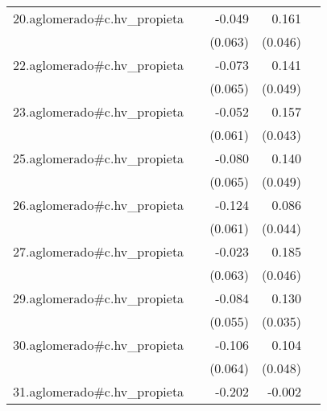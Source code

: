 {\begin{longtable}{l*{4}{D{.}{.}{-1}}}
\addlinespace
20.aglomerado#c.hv\_propieta&                     &      -0.049         &       0.161\sym{***}&                     \\
            &                     &     (0.063)         &     (0.046)         &                     \\
\addlinespace
22.aglomerado#c.hv\_propieta&                     &      -0.073         &       0.141\sym{**} &                     \\
            &                     &     (0.065)         &     (0.049)         &                     \\
\addlinespace
23.aglomerado#c.hv\_propieta&                     &      -0.052         &       0.157\sym{***}&                     \\
            &                     &     (0.061)         &     (0.043)         &                     \\
\addlinespace
25.aglomerado#c.hv\_propieta&                     &      -0.080         &       0.140\sym{**} &                     \\
            &                     &     (0.065)         &     (0.049)         &                     \\
\addlinespace
26.aglomerado#c.hv\_propieta&                     &      -0.124\sym{*}  &       0.086\sym{*}  &                     \\
            &                     &     (0.061)         &     (0.044)         &                     \\
\addlinespace
27.aglomerado#c.hv\_propieta&                     &      -0.023         &       0.185\sym{***}&                     \\
            &                     &     (0.063)         &     (0.046)         &                     \\
\addlinespace
29.aglomerado#c.hv\_propieta&                     &      -0.084         &       0.130\sym{***}&                     \\
            &                     &     (0.055)         &     (0.035)         &                     \\
\addlinespace
30.aglomerado#c.hv\_propieta&                     &      -0.106         &       0.104\sym{*}  &                     \\
            &                     &     (0.064)         &     (0.048)         &                     \\
\addlinespace
31.aglomerado#c.hv\_propieta&                     &      -0.202\sym{**} &      -0.002         &                     \\

\end{longtable}}
